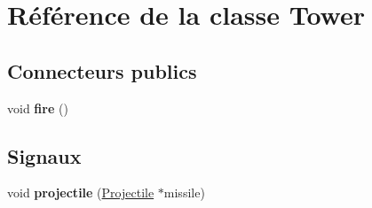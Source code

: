 \hypertarget{classTower}{
\section{Référence de la classe Tower}
\label{classTower}
}
\subsection*{Connecteurs publics}
\begin{DoxyCompactItemize}
\item 
\hypertarget{classTower_aa0c9c780f48cffacd3da6877f5d4fdc2}{
void {\bfseries fire} ()}
\label{classTower_aa0c9c780f48cffacd3da6877f5d4fdc2}

\end{DoxyCompactItemize}
\subsection*{Signaux}
\begin{DoxyCompactItemize}
\item 
\hypertarget{classTower_aa303fa5bcabcf781c459d129b01ecfe8}{
void {\bfseries projectile} (\hyperlink{classProjectile}{Projectile} $\ast$missile)}
\label{classTower_aa303fa5bcabcf781c459d129b01ecfe8}

\end{DoxyCompactItemize}
